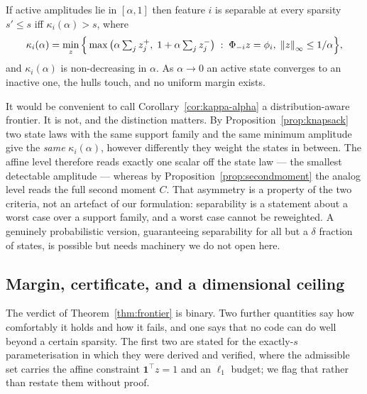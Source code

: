 \begin{corollary}
\label{cor:kappa-alpha}
If active amplitudes lie in $[\alpha,1]$ then feature $i$ is separable at every sparsity
$s'\le s$ iff $\kappa_i(\alpha)>s$, where
\[
  \kappa_i(\alpha)=\min_z\Big\{\max\big(\alpha\textstyle\sum_jz^{+}_j,\;
  1+\alpha\sum_jz^{-}_j\big)\;:\;\Phi_{-i}z=\phi_i,\;\left\lVert z \right\rVert_\infty\le1/\alpha\Big\},
\]
and $\kappa_i(\alpha)$ is non-decreasing in $\alpha$. As $\alpha\to0$ an active state converges
to an inactive one, the hulls touch, and no uniform margin exists.
\end{corollary}

\begin{remark}
\label{rem:notdistributional}
It would be convenient to call Corollary~\ref{cor:kappa-alpha} a distribution-aware frontier. It
is not, and the distinction matters. By Proposition~\ref{prop:knapsack} two state laws with the
same support family and the same minimum amplitude give the \emph{same} $\kappa_i(\alpha)$,
however differently they weight the states in between. The affine level therefore reads exactly
one scalar off the state law --- the smallest detectable amplitude --- whereas by
Proposition~\ref{prop:secondmoment} the analog level reads the full second moment $C$. That
asymmetry is a property of the two criteria, not an artefact of our formulation: separability is
a statement about a worst case over a support family, and a worst case cannot be reweighted. A
genuinely probabilistic version, guaranteeing separability for all but a $\delta$ fraction of
states, is possible but needs machinery we do not open here.
\end{remark}

\subsection{Margin, certificate, and a dimensional ceiling}
\label{sec:frontier-margin}

The verdict of Theorem~\ref{thm:frontier} is binary. Two further quantities say how comfortably
it holds and how it fails, and one says that no code can do well beyond a certain sparsity. The
first two are stated for the exactly-$s$ parameterisation in which they were derived and
verified, where the admissible set carries the affine constraint $\mathbf 1^{\top}z=1$ and an
$\ell_1$ budget; we flag that rather than restate them without proof.

